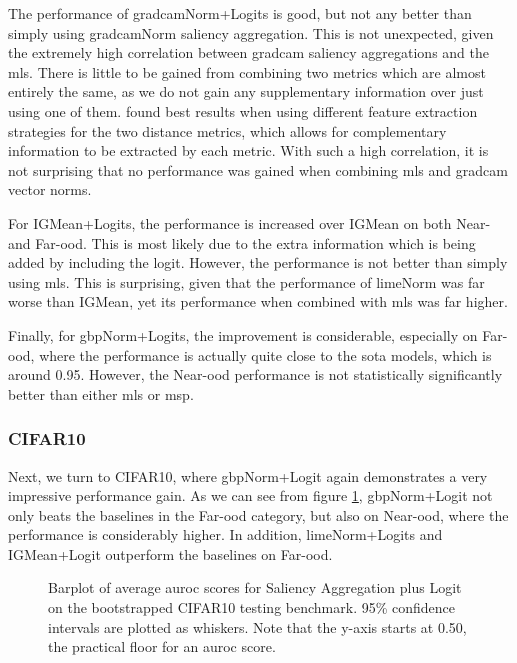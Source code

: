 \documentclass[UKenglish]{uiomasterthesis} %
\theoremstyle{definition}
\begin{document}
The performance of \ac{gradcam}Norm+Logits is good, but not any better than simply using \ac{gradcam}Norm saliency aggregation. This is not unexpected, given the extremely high correlation between \ac{gradcam} saliency aggregations and the \ac{mls}. There is little to be gained from combining two metrics which are almost entirely the same, as we do not gain any supplementary information over just using one of them. \cite{combood} found best results when using different feature extraction strategies for the two distance metrics, which allows for complementary information to be extracted by each metric. With such a high correlation, it is not surprising that no performance was gained when combining \ac{mls} and \ac{gradcam} vector norms.

For IGMean+Logits, the performance is increased over IGMean on both Near- and Far-\ac{ood}. This is most likely due to the extra information which is being added by including the logit. However, the performance is not better than simply using \ac{mls}. This is surprising, given that the performance of \ac{lime}Norm was far worse than IGMean, yet its performance when combined with \ac{mls} was far higher.

Finally, for \ac{gbp}Norm+Logits, the improvement is considerable, especially on Far-\ac{ood}, where the performance is actually quite close to the \ac{sota} models, which is around 0.95. However, the Near-\ac{ood} performance is not statistically significantly better than either \ac{mls} or \ac{msp}.



\subsubsection{CIFAR10}

Next, we turn to CIFAR10, where \ac{gbp}Norm+Logit again demonstrates a very impressive performance gain. As we can see from figure \ref{fig:cifar10_salpluslogit_bootstrap_barplot}, \ac{gbp}Norm+Logit not only beats the baselines in the Far-\ac{ood} category, but also on Near-\ac{ood}, where the performance is considerably higher. In addition, \ac{lime}Norm+Logits and IGMean+Logit outperform the baselines on Far-\ac{ood}.

\begin{figure}[H]
    \begin{center}
        
    \end{center}
    \caption[CIFAR10 Saliency Aggregation plus Logit Bootstrap]{Barplot of average \ac{auroc} scores for Saliency Aggregation plus Logit on the bootstrapped CIFAR10 testing benchmark. 95\% confidence intervals are plotted as whiskers. Note that the y-axis starts at 0.50, the practical floor for an \ac{auroc} score.}
    \label{fig:cifar10_salpluslogit_bootstrap_barplot}
\end{figure}
\end{document}
